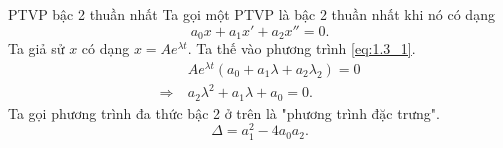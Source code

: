 \begin{frame}{PTVP bậc 2 thuần nhất}
    Ta gọi một PTVP là bậc 2  thuần nhất khi nó có dạng \cite{morin2008introduction}
    \begin{equation}
        a_0 x + a_1 x' + a_2 x'' = 0.
        \label{eq:1.3_1}
    \end{equation}
    Ta giả sử \(x\) có dạng \(x = A e^{\lambda t}\). Ta thế vào phương trình \ref{eq:1.3_1}. 
    \begin{equation*}
    \begin{split}
        & A e^{\lambda t} ( a_0 + a_1 \lambda + a_2 \lambda_2) = 0
        \\
       \Rightarrow \ & a_2 \lambda^2 + a_1 \lambda + a_0 = 0.
    \end{split}
    \end{equation*}
    Ta gọi phương trình đa thức bậc 2 ở trên là "phương trình đặc trưng". 
    \begin{equation*}
        \Delta = a_1^2 - 4 a_0 a_2.
    \end{equation*}
\end{frame}

